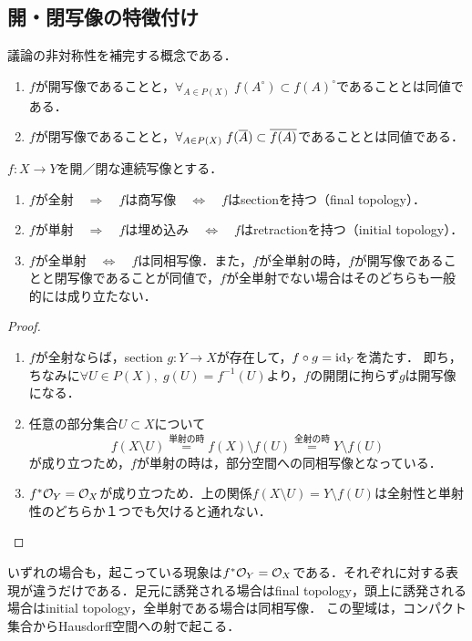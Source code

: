 \documentclass[uplatex,dvipdfmx]{jsreport}
\begin{document}
\subsection{開・閉写像の特徴付け}

\begin{tcolorbox}[colframe=ForestGreen, colback=ForestGreen!10!white,breakable,colbacktitle=ForestGreen!40!white,coltitle=black,fonttitle=\bfseries\sffamily,
title=]
    議論の非対称性を補完する概念である．
\end{tcolorbox}

\begin{proposition}\mbox{}
    \begin{enumerate}
        \item $f$が開写像であることと，$\forall_{A\in P(X)}\;f(A^\circ)\subset f(A)^\circ$であることとは同値である．
        \item $f$が閉写像であることと，$\forall_{A\in P(X)}\;f(\overline{A})\subset \overline{f(A)}$であることとは同値である．
    \end{enumerate}
\end{proposition}

\begin{theorem}
    $f:X\to Y$を開／閉な連続写像とする．
    \begin{enumerate}
        \item $f$が全射$\quad\Rightarrow\quad f$は商写像$\quad\Leftrightarrow\quad f$はsectionを持つ（final topology）．
        \item $f$が単射$\quad\Rightarrow\quad f$は埋め込み$\quad\Leftrightarrow\quad f$はretractionを持つ（initial topology）．
        \item $f$が全単射$\quad\Leftrightarrow\quad f$は同相写像．また，$f$が全単射の時，$f$が開写像であることと閉写像であることが同値で，$f$が全単射でない場合はそのどちらも一般的には成り立たない．
    \end{enumerate}
\end{theorem}
\begin{proof}\mbox{}
    \begin{enumerate}
        \item $f$が全射ならば，section $g:Y\to X$が存在して，$f\circ g=\mathrm{id}_Y$を満たす．
        即ち，
        ちなみに$\forall U\in P(X),\;g(U)=f^{-1}(U)$より，$f$の開閉に拘らず$g$は開写像になる．
        \item 任意の部分集合$U\subset X$について\[f(X\setminus U)\overset{単射の時}{=}f(X)\setminus f(U)\overset{全射の時}{=}Y\setminus f(U)\]
        が成り立つため，$f$が単射の時は，部分空間への同相写像となっている．
        \item $f^*\mathcal{O}_Y=\mathcal{O}_X$が成り立つため．上の関係$f(X\setminus U)=Y\setminus f(U)$は全射性と単射性のどちらか１つでも欠けると通れない．
    \end{enumerate}
\end{proof}
\begin{remarks}
    いずれの場合も，起こっている現象は$f^*\mathcal{O}_Y=\mathcal{O}_X$である．それぞれに対する表現が違うだけである．足元に誘発される場合はfinal topology，頭上に誘発される場合はinitial topology，全単射である場合は同相写像．
    この聖域は，コンパクト集合からHausdorff空間への射で起こる．
\end{remarks}
\end{document}
